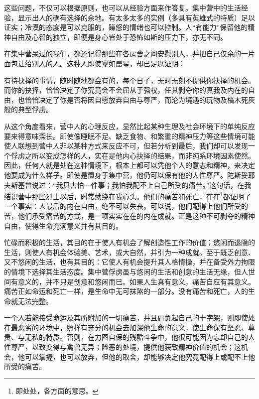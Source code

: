 \documentclass[11pt,oneside]{book}
\begin{document}
\begin{common-format}
这些问题，不仅可以根据原则，也可以从经验方面来作答复。集中营中的生活经验，显示出人的确有选择的余地。有太多太多的实例（多具有英雄式的特质）足以证实；冷漠的态度是可以克服的，躁怒的情绪也可以控制。人“有能力”保留他的精神自由及心智的独立，即便是身心皆处于恐怖如斯的压力下，亦无不同。

在集中营呆过的我们，都还记得那些在各房舍之间安慰别人，并把自己仅余的一片面包让给别人的人。这种人即使寥如晨星，却已足以证明：

有待抉择的事情，随时随地都会有的，每个日子，无时无刻不提供你抉择的机会。而你的抉择，恰恰决定了你究竟会不会屈从于强权，任其剥夺你的真我及内在的自由，也恰恰决定了你是否将因自愿放弃自由与尊严，而沦为境遇的玩物及槁木死灰般的典型俘虏。

从这个角度看来，营中人的心理反应，显然比起某种生理及社会环境下的单纯反应要来得意味深长。即使像睡眠不足、缺乏食物、和繁重的精神压力等这些情境可能使人联想到营中人非以某种方式来反应不可，但若分析到最后，我们却可以发现一个俘虏之所以变成怎样的人，实在是他内心抉择的结果，而非纯系环境因素使然。因此，任何人就是处在这种情境下，根本上都可以凭他个人的意志和精神，来决定他要成为什么样子。即使是置身于集中营，他仍可以保有他的人性尊严。陀斯妥耶夫斯基曾说过：“我只害怕一件事；我怕我配不上自己所受的痛苦。”这句话，在我结识营中那些烈士以后，时常萦绕在我心头。他们的痛苦和死亡，在在\footnote{即处处，各方面的意思。}都证明了一个事实：人最后的内在自由，绝不可以失丧。可以说，他们配得上他们所受的苦，他们承受痛苦的方式，是一项实实在在的内在成就。正是这种不可剥夺的精神自由，使得生命充满意义并有其目的。

忙碌而积极的生活，其目的在于使人有机会了解创造性工作的价值；悠闲而退隐的生活，则使人有机会体验美、艺术，或大自然，并引为一种成就。至于既乏创意、又不悠闲的生活，也有其目的：它使人有机会提升其人格情操，并在备受外力拘限的情境下选择其生活态度。集中营俘虏虽与悠闲的生活和创意的生活无缘，但人世间有意义的，并不只是创意和悠闲而已。如果人生真有意义，痛苦自应有其意义。痛苦正如命运和死亡一样，是生命中无可抹煞的一部分。没有痛苦和死亡，人的生命就无法完整。

一个人若能接受命运及其所附加的一切痛苦，并且肩负起自己的十字架，则即使处在最恶劣的环境中，照样有充分的机会去加深他生命的意义，使生命保有坚忍、尊贵、与无私的特质。否则，在力图自保的残酷斗争中，他很可能因为忘却自己的人性尊严，以致变得与禽兽无异；险恶的处境，提供他获致精神价值的机会；这机会，他可以掌握，也可以放弃，但他的取舍，却能够决定他究竟配得上或配不上他所受的痛苦。


\end{common-format}
\end{document}

